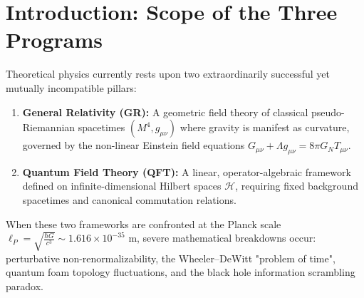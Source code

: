 \documentclass[11pt,a4paper,reqno]{amsart}
\theoremstyle{definition}
\numberwithin{equation}{section}
\begin{document}
\maketitle

\tableofcontents
\newpage

\section{Introduction: Scope of the Three Programs}
\label{sec:intro}

Theoretical physics currently rests upon two extraordinarily successful yet mutually incompatible pillars:
\begin{enumerate}[label=(\alph*)]
    \item \textbf{General Relativity (GR):} A geometric field theory of classical pseudo-Riemannian spacetimes $(M^4, g_{\mu\nu})$ where gravity is manifest as curvature, governed by the non-linear Einstein field equations $G_{\mu\nu} + \Lambda g_{\mu\nu} = 8\pi G_N T_{\mu\nu}$.
    \item \textbf{Quantum Field Theory (QFT):} A linear, operator-algebraic framework defined on infinite-dimensional Hilbert spaces $\mathscr{H}$, requiring fixed background spacetimes and canonical commutation relations.
\end{enumerate}

When these two frameworks are confronted at the Planck scale $\ell_P = \sqrt{\frac{\hbar G}{c^3}} \sim 1.616 \times 10^{-35}\text{ m}$, severe mathematical breakdowns occur: perturbative non-renormalizability, the Wheeler--DeWitt "problem of time", quantum foam topology fluctuations, and the black hole information scrambling paradox.
\end{document}
